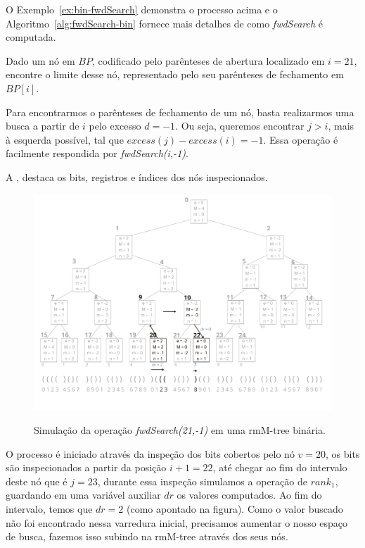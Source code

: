     O Exemplo~\ref*{ex:bin-fwdSearch} demonstra o processo acima e o Algoritmo~\ref{alg:fwdSearch-bin} fornece mais detalhes de como \textit{fwdSearch} é computada.

    \begin{example}\label{ex:bin-fwdSearch} 
        Dado um nó em $BP$, codificado pelo parênteses de abertura localizado em $i=21$, encontre o limite desse nó, representado pelo seu parênteses de fechamento em $BP[i]$. 
        
        Para encontrarmos o parênteses de fechamento de um nó, basta realizarmos uma busca a partir de $i$ pelo excesso $d=-1$. Ou seja, queremos encontrar $j>i$, mais à esquerda possível, tal que $excess(j) - excess(i) = -1$.
        Essa operação é facilmente respondida por \textit{fwdSearch(i,-1)}.

        A , destaca os bits, registros e índices dos nós inspecionados.
        \begin{figure}[h!]
           \centering
             \caption[fwdSearch(21,-1).]{Simulação da operação \textit{fwdSearch(21,-1)} em uma rmM-tree binária.}
             \includegraphics[width=\columnwidth]{images/rmm-tree-bin-fwdsearch.png}
             \label{fig:bin-fwdSearch}
        \end{figure}

        O processo é iniciado através da inspeção dos bits cobertos pelo nó $v=20$, os bits são inspecionados a partir da posição $i+1=22$, até chegar ao
        fim do intervalo deste nó que é $j=23$, durante essa inspeção simulamos a operação de $rank_1$, guardando em uma variável auxiliar $dr$ os valores computados. 
        Ao fim do intervalo, temos que $dr=2$ (como apontado na figura). Como o valor buscado não foi encontrado nessa varredura inicial, precisamos aumentar o nosso espaço de busca, fazemos isso subindo na rmM-tree através dos seus nós. 
        

\end{example}
